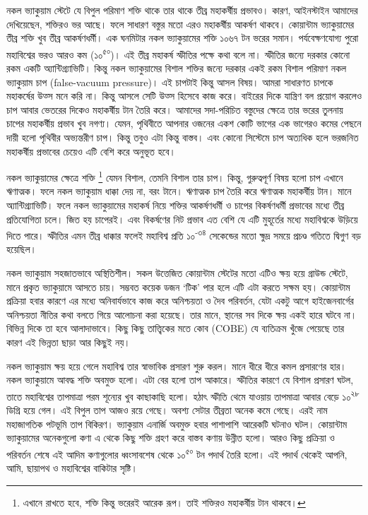 \documentclass[
]{book}
\begin{document}
নকল ভ্যাকুয়াম স্টেটে যে বিপুল পরিমাণ শক্তি থাকে তার থাকে তীব্র মহাকর্ষীয় প্রভাবও। কারণ, আইনস্টাইন আমাদের দেখিয়েছেন, শক্তিরও ভর আছে। ফলে সাধারণ বস্তুর মতো এরও মহাকর্ষীয় আকর্ষণ থাকবে। কোয়ান্টাম ভ্যাকুয়ামের তীব্র শক্তি খুব তীব্র আকর্ষণধর্মী। এক ঘনমিটার নকল ভ্যাকুয়ামের শক্তি ১০৬৭ টন ভরের সমান। পর্যবেক্ষণযোগ্য পুরো মহাবিশ্বের ভরও আরও কম (১০\textsuperscript{৫০})। এই তীব্র মহাকর্ষ স্ফীতির পক্ষে কথা বলে না। স্ফীতির জন্যে দরকার কোনো রকম একটি অ্যান্টিগ্র্যাভিটি। কিন্তু নকল ভ্যাকুয়ামের বিশাল শক্তির জন্যে দরকার একই রকম বিশাল পরিমাণ নকল ভ্যাকুয়াম চাপ (false-vacuum pressure)। এই চাপটাই কিন্তু আসল বিষয়। আমরা সাধারণত চাপকে মহাকর্ষের উত্স মনে করি না। কিন্তু আসলে সেটি উত্স হিসেবে কাজ করে। বাইরের দিকে যান্ত্রিণ বল প্রয়োগ করলেও চাপ আবার ভেতরের দিকেও মহাকর্ষীয় টান তৈরি করে। আমাদের সদা-পরিচিত বস্তুদের ক্ষেত্রে তার ভরের তুলনায় চাপের মহাকর্ষীয় প্রভাব খুব নগণ্য। যেমন, পৃথিবীতে আপনার ওজনের একশ কোটি ভাগের এক ভাগেরও কমের পেছনে দায়ী হলো পৃথিবীর অভ্যন্তরীণ চাপ। কিন্তু তবুও এটা কিন্তু বাস্তব। এবং কোনো সিস্টেমে চাপ অত্যধিক হলে ভরজনিত মহাকর্ষীয় প্রভাবের চেয়েও এটি বেশি করে অনুভূত হবে।

নকল ভ্যাকুয়ামের ক্ষেত্রে শক্তি \footnote{এখানে রাখতে হবে, শক্তি কিন্তু ভরেরই আরেক রূপ। তাই শক্তিরও মহাকর্ষীয় টান থাকবে।} যেমন বিশাল, তেমনি বিশাল তার চাপ। কিন্তু, গুরুত্বপূর্ণ বিষয় হলো চাপ এখানে ঋণাত্মক। ফলে নকল ভ্যাকুয়াম ধাক্কা দেয় না, বরং টানে। ঋণাত্মক চাপ তৈরি করে ঋণাত্মক মহাকর্ষীয় টান। মানে অ্যান্টিগ্র্যাভিটি। ফলে নকল ভ্যাকুয়ামের মহাকর্ষ নিয়ে শক্তির আকর্ষণধর্মী ও চাপের বিকর্ষণধর্মী প্রভাবের মধ্যে তীব্র প্রতিযোগিতা চলে। জিত হয় চাপেরই। এবং বিকর্ষণের নিট প্রভাব এত বেশি যে এটি মুহূর্তের মধ্যে মহাবিশ্বকে উড়িয়ে দিতে পারে। স্ফীতির এমন তীব্র ধাক্কার ফলেই মহাবিশ্ব প্রতি ১০\textsuperscript{-৩৪} সেকেন্ডের মতো ক্ষুদ্র সময়ে প্রচণ্ড গতিতে দ্বিগুণ বড় হয়েছিল।

নকল ভ্যাকুয়াম সহজাতভাবে অস্থিতিশীল। সকল উত্তেজিত কোয়ান্টাম স্টেটের মতো এটিও ক্ষয় হয়ে গ্রাউন্ড স্টেটে, মানে প্রকৃত ভ্যাকুয়ামে আসতে চায়। সম্ভবত কয়েক ডজন `টিক' পার হলে এটি এটা করতে সক্ষম হয়। কোয়ান্টাম প্রক্রিয়া হবার কারণে এর মধ্যে অনিবার্যভাবে কাজ করে অনিশ্চয়তা ও দৈব পরিবর্তন, যেটা একটু আগে হাইজেনবার্গের অনিশ্চয়তা নীতির কথা বলতে গিয়ে আলোচনা করা হয়েছে। তার মানে, স্থানের সব দিকে ক্ষয় একই হারে ঘটবে না। বিভিন্ন দিকে তা হবে আলাদাভাবে। কিছু কিছু তাত্ত্বিকের মতে কোব (COBE) যে ব্যতিক্রম খুঁজে পেয়েছে তার কারণ এই ভিন্নতা ছাড়া আর কিছুই নয়।

নকল ভ্যাকুয়াম ক্ষয় হয়ে গেলে মহাবিশ্ব তার স্বাভাবিক প্রসারণ শুরু করল। মানে ধীরে ধীরে কমল প্রসারণের হার। নকল ভ্যাকুয়ামে আবদ্ধ শক্তি অবমুক্ত হলো। এটা বের হলো তাপ আকারে। স্ফীতির কারণে যে বিশাল প্রসারণ ঘটল, তাতে মহাবিশ্বের তাপমাত্রা পরম শূন্যের খুব কাছাকাছি হলো। হঠাৎ স্ফীতি থেমে যাওয়ায় তাপমাত্রা আবার বেড়ে ১০\textsuperscript{২৮} ডিগ্রি হয়ে গেল। এই বিপুল তাপ আজও রয়ে গেছে। অবশ্য সেটার তীব্রতা অনেক কমে গেছে। এরই নাম মহাজাগতিক পটভূমি তাপ বিকিরণ। ভ্যাকুয়াম এনার্জি অবমুক্ত হবার পাশাপাশি আরেকটি ঘটনাও ঘটল। কোয়ান্টাম ভ্যাকুয়ামের অনেকগুলো কণা এ থেকে কিছু শক্তি গ্রহণ করে বাস্তব কণায় উন্নীত হলো। আরও কিছু প্রক্রিয়া ও পরিবর্তন শেষে এই আদিম কণাগুলোর ধ্বংসাবশেষ থেকে ১০\textsuperscript{৫০} টন পদার্থ তৈরি হলো। এই পদার্থ থেকেই আপনি, আমি, ছায়াপথ ও মহাবিশ্বের বাকিটার সৃষ্টি।
\end{document}
